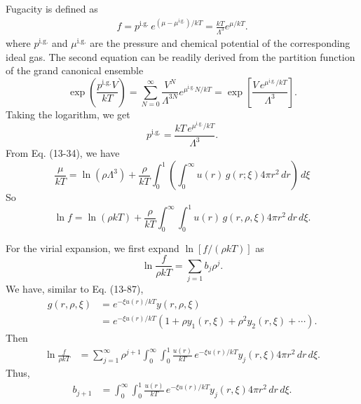 \documentclass[twocolumn, 10pt]{article}
\numberwithin{equation}{section}
\newenvironment{solution}[1][\empty]
{\par\medskip\sffamily
  \textbf{\ifx\empty#1{Solution.}\relax\else{#1}\fi} \ignorespaces}
{\medskip}
\begin{document}
\begin{solution}
  Fugacity is defined as
  \begin{align*}
    f = p^\mathrm{i.g.} \, e^{(\mu - \mu^\mathrm{i.g.})/kT}
      = \frac{ k T } { \Lambda^3 } e^{\mu/kT}.
  \end{align*}
  where $p^\mathrm{i.g.}$ and $\mu^\mathrm{i.g.}$
  are the pressure and chemical potential of
  the corresponding ideal gas.
  The second equation can be readily derived
  from the partition function of the grand canonical ensemble
  $$
  \exp\left( \frac{p^\mathrm{i.g.}V}{kT} \right)
  =
    \sum_{N=0}^\infty \frac{V^N}{\Lambda^{3N}}e^{\mu^\mathrm{i.g.} N/kT}
  = \exp\left[
    \frac{ V \, e^{\mu^\mathrm{i.g.}/kT} }{ \Lambda^3 }
    \right].
  $$
  Taking the logarithm, we get
  $$
  p^\mathrm{i.g.}
  = \frac{ kT \, e^{\mu^\mathrm{i.g.}/kT} }{ \Lambda^3 }.
  $$
  From Eq. (13-34), we have
  \begin{equation}
    \frac{\mu}{kT}
    =
    \ln(\rho\Lambda^3)
    +
    \frac{\rho}{kT}
    \int_0^1
    \left( \int_0^\infty
    u(r) \, g(r; \xi) 4 \pi r^2 \, dr \right) \, d\xi
    \tag{13-34}
  \end{equation}
  So
  \begin{equation*}
    \ln f
    =
    \ln(\rho kT)
    +
    \frac{\rho}{kT}
    \int_0^\infty
    \int_0^1
    u(r) \, g(r, \rho, \xi) 4 \pi r^2 \, dr \, d\xi.
  \end{equation*}

  For the virial expansion, we first expand $\ln[f/(\rho kT)]$ as
  $$
  \ln \frac{ f }{ \rho k T} = \sum_{j=1} b_j \rho^j.
  $$
  We have, similar to Eq. (13-87),
  \begin{align*}
  g(r, \rho, \xi)
    &=
    e^{-\xi u(r)/kT}
    y(r, \rho, \xi)
    \\
    &=
    e^{-\xi u(r)/kT}
    \left(
    1 + \rho y_1(r, \xi)
    + \rho^2 y_2(r, \xi) + \cdots
    \right)
    .
  \end{align*}
  Then
  \begin{align*}
    \ln \frac{ f } { \rho k T }
    &=
    \sum_{j=1}^\infty
    \rho^{j+1}
    \int_0^\infty
    \int_0^1
    \frac{u(r)} {kT} \, e^{-\xi u(r)/kT}
    y_j(r, \xi) 4 \pi r^2 \, dr \, d\xi.
  \end{align*}
  Thus,
  \begin{align*}
    b_{j+1}
    &=
    \int_0^\infty
    \int_0^1
    \frac{u(r)} {kT} \, e^{-\xi u(r)/kT}
    y_j(r, \xi) 4 \pi r^2 \, dr \, d\xi
    .
  \end{align*}


\end{solution}
\end{document}
